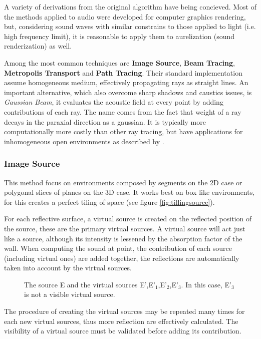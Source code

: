 A variety of derivations from the original algorithm have being concieved. Most
of the methods applied to audio were developed for computer graphics
rendering, but, considering sound waves with similar constrains to those
applied to light (i.e. high frequency limit), it is reasonable to apply them to
aurelization (sound renderization) as well.


Among the most common techniques are \textbf{Image Source}, \textbf{Beam
Tracing}, \textbf{Metropolis Transport} and \textbf{Path Tracing}. Their
standard implementation assume homogeneous medium, effectively propagating rays
as straight lines. An important alternative, which also overcome sharp shadows
and caustics issues, is \textit{Gaussian Beam}, it evaluates the acoustic field
at every point by adding contributions of each ray. The name comes from the fact
that weight of a ray decays in the paraxial direction as a gaussian. It is
typically more computationally more costly than other ray tracing, but have
applications for inhomogeneous open environments as described by
\citet{traceroutdoor}.

\subsubsection{Image Source}

This method focus on environments composed by segments on the 2D case or
polygonal slices of planes on the 3D case. It works best on box like
environments, for this creates a perfect tiling of
space\cite{funkhouser2003survey} (see figure \ref{fig:tillingsource}).

For each reflective surface, a virtual source is created on the reflected
position of the source, these are the primary virtual sources. A virtual source
will act just like a source, although its intensity is lessened by the absorption
factor of the wall. When computing the sound at point, the
contribution of each source (including virtual ones) are added together, the
reflections are automatically taken into account by the virtual sources.

\begin{figure}[h]
	\centering
	
	\caption{The source E and the virtual sources E',E'$_1$,E'$_2$,E'$_3$. In this
	case, E'$_3$ is not a visible virtual source.}
	\label{fig:imagesource}
\end{figure}


The procedure of creating the virtual sources may be repeated many times for
each new virtual sources, thus more reflection are effectively calculated. The
visibility of a virtual source must be validated before adding its contribution.

